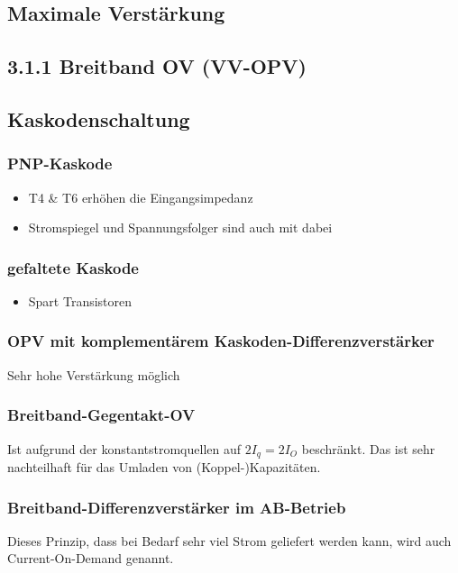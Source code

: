 \documentclass[a4paper]{article}
\begin{document}
\subsection*{Maximale Verstärkung}

\subsection*{3.1.1 Breitband OV (VV-OPV)}

\subsection*{Kaskodenschaltung}
\subsubsection*{PNP-Kaskode}
\begin{itemize}
    \item T4 \& T6 erhöhen die Eingangsimpedanz
    \item Stromspiegel und Spannungsfolger sind auch mit dabei
\end{itemize}
\subsubsection*{gefaltete Kaskode}
\begin{itemize}
    \item Spart Transistoren
\end{itemize}

\subsubsection*{OPV mit komplementärem Kaskoden-Differenzverstärker}
Sehr hohe Verstärkung möglich

\subsubsection*{Breitband-Gegentakt-OV}
Ist aufgrund der konstantstromquellen auf $2I_{q}=2I_{O}$ beschränkt. Das ist sehr nachteilhaft für das Umladen von (Koppel-)Kapazitäten.

\subsubsection*{Breitband-Differenzverstärker im AB-Betrieb}
Dieses Prinzip, dass bei Bedarf sehr viel Strom geliefert werden kann, wird auch Current-On-Demand genannt.
\end{document}
